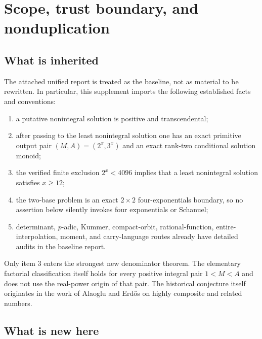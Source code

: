 \documentclass[11pt,oneside]{article}
\theoremstyle{definition}
\theoremstyle{remark}
\begin{document}
\tableofcontents
\clearpage
{}

\section{Scope, trust boundary, and nonduplication}
\label{sec:scope}

\subsection{What is inherited}

The attached unified report is treated as the baseline, not as material to be rewritten\cite{UnifiedReport2026}.
In particular, this supplement imports the following established facts and conventions:
\begin{enumerate}
\item a putative nonintegral solution is positive and transcendental;
\item after passing to the least nonintegral solution one has an exact primitive output pair
      $(M,A)=(2^x,3^x)$ and an exact rank-two conditional solution monoid;
\item the verified finite exclusion $2^x<4096$ implies that a least nonintegral solution
      satisfies $x\ge12$;
\item the two-base problem is an exact $2\times2$ four-exponentials boundary, so no assertion
      below silently invokes four exponentials or Schanuel;
\item determinant, $p$-adic, Kummer, compact-orbit, rational-function, entire-interpolation,
      moment, and carry-language routes already have detailed audits in the baseline report.
\end{enumerate}

Only item 3 enters the strongest new denominator theorem.  The elementary factorial
classification itself holds for every positive integral pair $1<M<A$ and does not use the
real-power origin of that pair.  The historical conjecture itself originates in the work of
Alaoglu and Erd\H{o}s on highly composite and related numbers\cite{AlaogluErdos1944}.

\subsection{What is new here}
\end{document}
